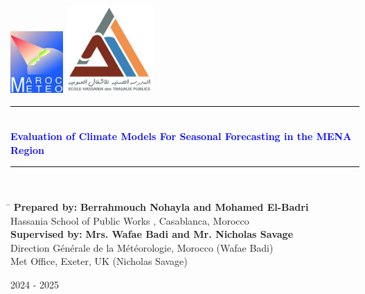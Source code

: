\thispagestyle{empty} %

\clearpage
\begin{titlepage}
  \begin{center}
    \includegraphics[width=0.15\textwidth]{DGM.jpg} \hfill
    \includegraphics[width=0.25\textwidth]{ehtp.jpg} \\[2cm]

    
    \noindent\rule{\textwidth}{1mm}\\[0.5cm]
    {\LARGE \textbf{\textcolor{blue}{Evaluation of Climate Models For Seasonal Forecasting in the MENA Region\\ \vspace{0.1cm} 
   }}}
    \noindent\rule{\textwidth}{1mm}\\[3cm]
    \vfill
   \begin{tabbing}
    \hspace{6cm} \= \kill 
    \textbf{\large Prepared by:} \> \textbf{Berrahmouch Nohayla and Mohamed El-Badri} \\[0.2cm]
    \> Hassania School of Public Works , Casablanca, Morocco \\[1cm]
    
    \textbf{\large Supervised by:} \> \textbf{Mrs. Wafae Badi and Mr. Nicholas Savage} \\[0.2cm]
    \> Direction Générale de la Météorologie, Morocco (Wafae Badi) \\[0.2cm]
    \> Met Office, Exeter, UK (Nicholas Savage) \\
\end{tabbing}

    \vfill

    {\large 2024 - 2025} \\[1cm]
  \end{center}
\end{titlepage}
\tableofcontents
\newpage
